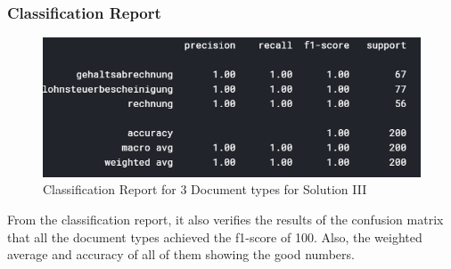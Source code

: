 \subsubsection{Classification Report}
\begin{figure}[H]
\centering
\includegraphics[scale=0.8]{images/Chapter5/sol_3/cr3_sol3.png}
\caption{Classification Report for 3 Document types for Solution III }
\label{cr_sol3}
\end{figure}
\par
From the classification report, it also verifies the results of the confusion matrix that all the document types achieved the f1-score of 100. Also, the weighted average and accuracy of all of them showing the good numbers.
